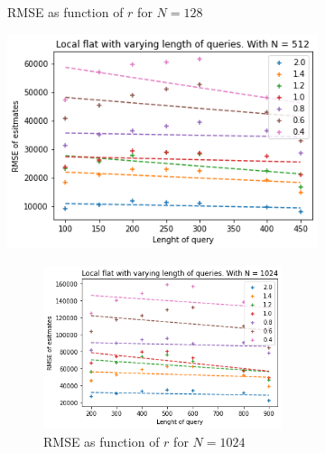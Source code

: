 \documentclass[11pt]{article}
\theoremstyle{definition}
\begin{document}
\begin{figure}[H]
\begin{subfigure}{.4\textwidth}
  \caption{RMSE as function of $r$ for $N=128$}
  \label{fig:23}
\end{subfigure}
\begin{subfigure}{.4\textwidth}
  \centering
  \includegraphics[width=\linewidth]{figures/local_flat/varying_r/loc_flat_varying_length_N_linear_=512.png}
  \caption{RMSE as function of $r$ for $N=512$}
  \label{fig:24}
  \begin{subfigure}{\textwidth}
  \centering
  \includegraphics[width=\linewidth]{figures/local_flat/varying_r/loc_flat_varying_length_N_linear_=1024.png}
  \caption{RMSE as function of $r$ for $N=1024$}
  \label{fig:25}
\end{subfigure}
\begin{subfigure}{\textwidth}
  \centering

\end{subfigure}
\end{subfigure}
\end{figure}
\end{document}
